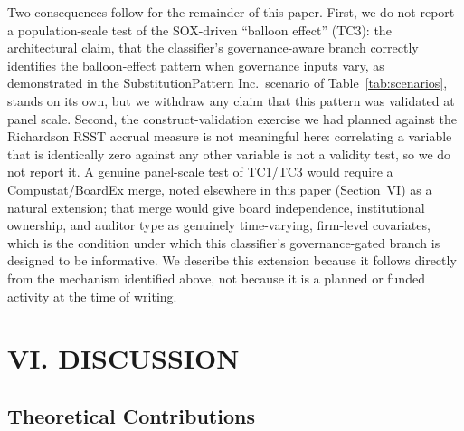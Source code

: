 \documentclass[12pt]{article}
\begin{document}
Two consequences follow for the remainder of this paper.  First, we do
not report a population-scale test of the SOX-driven ``balloon effect''
(TC3): the architectural claim, that the classifier's governance-aware
branch correctly identifies the balloon-effect pattern when governance
inputs vary, as demonstrated in the SubstitutionPattern Inc.\ scenario
of Table~\ref{tab:scenarios}, stands on its own, but we withdraw any
claim that this pattern was validated at panel scale.  Second, the
construct-validation exercise we had planned against the Richardson RSST
accrual measure is not meaningful here: correlating a variable that is
identically zero against any other variable is not a validity test, so
we do not report it.  A genuine panel-scale test of TC1/TC3 would require a
Compustat/BoardEx merge, noted elsewhere in this paper
(Section~VI) as a natural extension; that merge would give board
independence, institutional ownership, and auditor type as genuinely
time-varying, firm-level covariates, which is the condition under which
this classifier's governance-gated branch is designed to be informative.
We describe this extension because it follows directly from the
mechanism identified above, not because it is a planned or funded
activity at the time of writing.

\section*{\centering VI. DISCUSSION}
\label{sec:discuss}

\subsection*{Theoretical Contributions}
\end{document}
